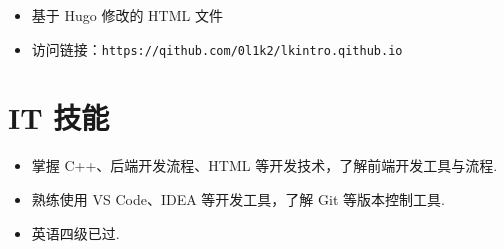 \begin{itemize}[parsep=0.2ex]
  \item 基于 Hugo 修改的 HTML 文件
  \item 访问链接：\texttt{https://qithub.com/0l1k2/lkintro.qithub.io}
\end{itemize}

\section{IT 技能}
\begin{itemize}[parsep=0.2ex]
  \item 掌握 C++、后端开发流程、HTML 等开发技术，了解前端开发工具与流程.
  \item 熟练使用 VS Code、IDEA 等开发工具，了解 Git 等版本控制工具.
  \item 英语四级已过.
\end{itemize}



